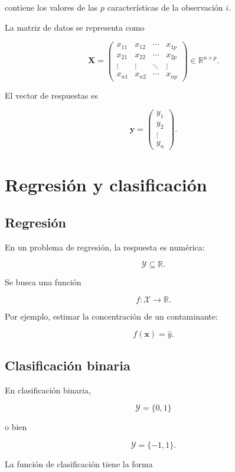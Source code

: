 \documentclass[
  spanish,
  11pt,
  letterpaper,
  DIV=11,
  numbers=noendperiod]{scrreprt}
\theoremstyle{definition}
\theoremstyle{plain}
\theoremstyle{definition}
\theoremstyle{remark}
\begin{document}
contiene los valores de las \(p\) características de la observación
\(i\).

La matriz de datos se representa como

\[
\mathbf{X}
=
\begin{pmatrix}
x_{11} & x_{12} & \cdots & x_{1p}\\
x_{21} & x_{22} & \cdots & x_{2p}\\
\vdots & \vdots & \ddots & \vdots\\
x_{n1} & x_{n2} & \cdots & x_{np}
\end{pmatrix}
\in\mathbb{R}^{n\times p}.
\]

El vector de respuestas es

\[
\mathbf{y}
=
\begin{pmatrix}
y_1\\
y_2\\
\vdots\\
y_n
\end{pmatrix}.
\]

\section{Regresión y
clasificación}\label{regresiuxf3n-y-clasificaciuxf3n}

\subsection{Regresión}\label{regresiuxf3n}

En un problema de regresión, la respuesta es numérica:

\[
\mathcal{Y}\subseteq\mathbb{R}.
\]

Se busca una función

\[
f:\mathcal{X}\to\mathbb{R}.
\]

Por ejemplo, estimar la concentración de un contaminante:

\[
f(\mathbf{x})
=
\widehat{y}.
\]

\subsection{Clasificación binaria}\label{clasificaciuxf3n-binaria}

En clasificación binaria,

\[
\mathcal{Y}=\{0,1\}
\]

o bien

\[
\mathcal{Y}=\{-1,1\}.
\]

La función de clasificación tiene la forma
\end{document}
